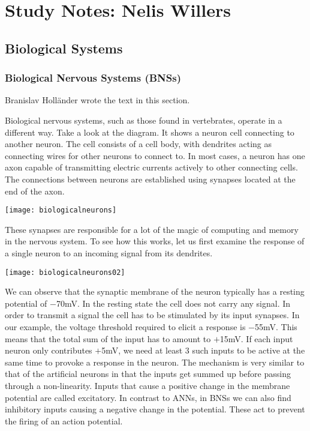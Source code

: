 
\part{Study Notes: Nelis Willers}

\chapter{Biological Systems}



\section{Biological Nervous Systems (BNSs)}

Branislav Holl\"{a}nder \cite{Hollander2018} wrote the text in this section.

Biological nervous systems, such as those found in vertebrates, operate in a different way. Take a look at the diagram. It shows a neuron cell connecting to another neuron. The cell consists of a cell body, with dendrites acting as connecting wires for other neurons to connect to. In most cases, a neuron has one axon capable of transmitting electric currents actively to other connecting cells. The connections between neurons are established using synapses located at the end of the axon. 
\begin{marginfigure}
\texttt{[image: biologicalneurons]}
\end{marginfigure}

These synapses are responsible for a lot of the magic of computing and memory in the nervous system. To see how this works, let us first examine the response of a single neuron to an incoming signal from its dendrites\cite{Synaptidude2005}.
\begin{marginfigure}
\texttt{[image: biologicalneurons02]}
\end{marginfigure}
We can observe that the synaptic membrane of the neuron typically has a resting potential of $-$70mV. In the resting state the cell does not carry any signal. In order to transmit a signal the cell has to be stimulated by its input synapses. In our example, the voltage threshold required to elicit a response is $-$55mV. This means that the total sum of the input has to amount to $+$15mV. If each input neuron only contributes $+$5mV, we need at least 3 such inputs to be active at the same time to provoke a response in the neuron. The mechanism is very similar to that of the artificial neurons in that the inputs get summed up before passing through a non-linearity. Inputs that cause a positive change in the membrane potential are called excitatory. In contrast to ANNs, in BNSs we can also find inhibitory inputs causing a negative change in the potential. These act to prevent the firing of an action potential.


